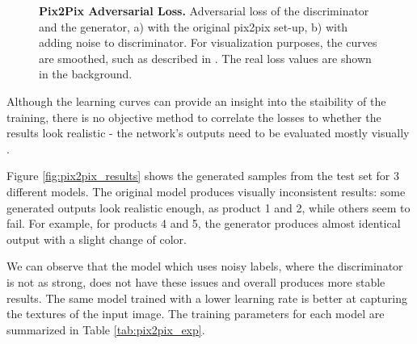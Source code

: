 \documentclass[12pt]{report}
\begin{document}
\begin{figure}[t]
\centering
{}
\caption{\label{fig:pix2pix_losses} \textbf{Pix2Pix Adversarial Loss.} Adversarial loss of the discriminator and the generator, a) with the original pix2pix set-up, b) with adding noise to discriminator. For visualization purposes, the curves are smoothed, such as described in \cite{noauthor_tensorflows_2018}. The real loss values are shown in the background.}
\end{figure}

Although the learning curves can provide an insight into the staibility of the training, there is no objective method to correlate the losses to whether the results look realistic - the network's outputs need to be evaluated mostly visually \cite{preserve_knowledge_how_nodate}. 

Figure \ref{fig:pix2pix_results} shows the generated samples from the test set for 3 different models. The original model produces visually inconsistent results: some generated outputs look realistic enough, as product 1 and 2, while others seem to fail. For example, for products 4 and 5, the generator produces almost identical output with a slight change of color.

We can observe that the model which uses noisy labels, where the discriminator is not as strong, does not have these issues and overall produces more stable results. The same model trained with a lower learning rate is better at capturing the textures of the input image. The training parameters for each model are summarized in Table \ref{tab:pix2pix_exp}.
\end{document}
